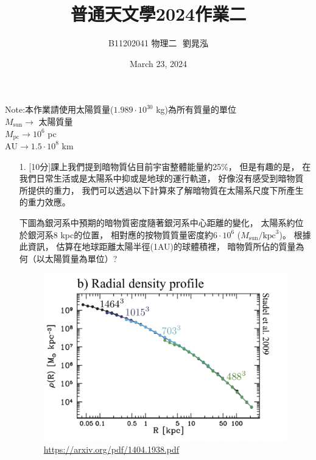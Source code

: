 \documentclass{article}
\title{普通天文學2024作業二}
\author{B11202041 物理二 $ $ 劉晁泓}
\date{March 23, 2024}
\theoremstyle{definition}
\begin{document}
\maketitle
\thispagestyle{fancy}
\renewcommand{\footrulewidth}{0.4pt}
\cfoot{\thepage}
\renewcommand{\headrulewidth}{0.4pt}

\setlength{\parindent}{0pt}
Note:本作業請使用太陽質量($1.989 \cdot 10^{30}$ kg)為所有質量的單位\\
$M_{\text{sun}} \rightarrow$ 太陽質量\\
$M_{\text{pc}} \rightarrow 10^6$ pc\\
$\text{AU} \rightarrow 1.5 \cdot 10^8$ km

\setlength{\parindent}{20pt}
\begin{enumerate}
	\item[1.] [10分]課上我們提到暗物質佔目前宇宙整體能量約25\%，
		但是有趣的是，
		在我們日常生活或是太陽系中抑或是地球的運行軌道，
		好像沒有感受到暗物質所提供的重力，
		我們可以透過以下計算來了解暗物質在太陽系尺度下所產生的重力效應。\\
		\par 下圖為銀河系中預期的暗物質密度隨著銀河系中心距離的變化，
		太陽系約位於銀河系8 kpc的位置，
		相對應的按物質質量密度約$6 \cdot 10^6$ ($M_{\text{sun}}/\text{kpc}^3$)。
		根據此資訊，
		估算在地球距離太陽半徑(1AU)的球體積裡，
		暗物質所佔的質量為何（以太陽質量為單位）?

		\begin{figure}[h]
			\centering
			\includegraphics[scale = 0.2]{hw2-1.png}
			\caption{\url{https://arxiv.org/pdf/1404.1938.pdf}}
			\label{fig1}
		\end{figure}


\end{enumerate}
\end{document}
